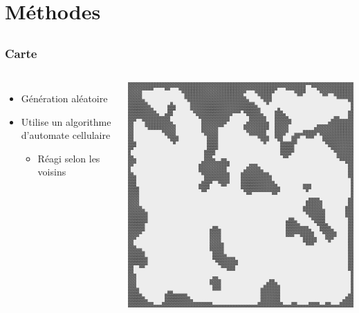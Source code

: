\documentclass{beamer}
\begin{document}
\section{Méthodes}
\subsection{}

\begin{frame}
\frametitle{Carte}
\begin{columns}
\begin{itemize}
	\item Génération aléatoire
	\item Utilise un algorithme d'automate cellulaire
	\begin{itemize}
		\item Réagi selon les voisins
	\end{itemize}
\end{itemize}
\begin{center}
\includegraphics[width=1\textwidth]{img/map_example.png}\\
\end{center}
\end{columns}
\end{frame}
\end{document}

